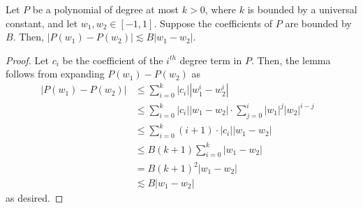 \begin{lemma} \label{lemma:polynomial_difference}
Let $P$ be a polynomial of degree at most $k > 0$, where $k$ is bounded by a universal constant, and let $w_1, w_2 \in [-1, 1]$. Suppose the coefficients of $P$ are bounded by $B$. Then, $|P(w_1) - P(w_2)| \lesssim B |w_1 - w_2|$.
\end{lemma}
\begin{proof}
Let $c_i$ be the coefficient of the $i^{th}$ degree term in $P$. Then, the lemma follows from expanding $P(w_1) - P(w_2)$ as
\begin{align}
|P(w_1) - P(w_2)|
& \leq \sum_{i = 0}^k |c_i| |w_1^i - w_2^i| \\
& \leq \sum_{i = 0}^k |c_i| |w_1 - w_2| \cdot \sum_{j = 0}^i |w_1|^j |w_2|^{i - j} \\
& \leq \sum_{i = 0}^k (i + 1) \cdot |c_i| |w_1 - w_2|
& \tag{B.c. $|w_1|, |w_2| \leq 1$} \\
& \leq B (k + 1) \sum_{i = 0}^k |w_1 - w_2| \\
& = B(k + 1)^2 |w_1 - w_2| \\
& \lesssim B |w_1 - w_2|
& \tag{B.c. $k$ is at most an absolute constant}
\end{align}
as desired.
\end{proof}

